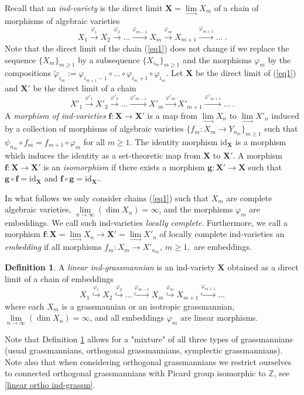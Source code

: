 \documentclass[12pt]{amsart}
\renewcommand{\phi}{\varphi}
\theoremstyle{definition}
\newtheorem{definition}[theorem]{Definition}
\begin{document}
Recall that an \textit{ind-variety} is the direct limit
$\mathbf{X}=\underset{\longrightarrow}\lim X_m$
of a chain of morphisms of algebraic varieties
\begin{equation}\label{eq1}
X_1\stackrel{\phi_1}{\to}X_2\stackrel{\phi_2}{\to}\dots\stackrel{\phi_{m-1}}{\to}X_m\stackrel{\phi_m}{\to}
X_{m+1}\stackrel{\phi_{m+1}}{\to}\dots\ .
\end{equation}
Note that the direct limit of the chain (\ref{eq1})
does not change if we replace the sequence
$\{X_m\}_{m\ge1}$ by a subsequence $\{X_{i_m}\}_{m\ge1}$ and the morphisms $\phi_m$ by the compositions
$\tilde{\phi}_{i_m}:={\phi}_{i_{m+1}-1}\circ...\circ{\phi}_{i_m+1}\circ{\phi}_{i_m}$.
Let $\mathbf{X}$ be the direct limit of (\ref{eq1}) and  $\mathbf{X}'$ be the direct limit of a chain
\begin{equation}\label{eq1'}
X'_1\stackrel{\phi'_1}{\to}X'_2\stackrel{\phi'_2}{\to}\dots\stackrel{\phi'_{m-1}}{\to}X'_m\stackrel{\phi'_m}{\to}
X'_{m+1}\stackrel{\phi'_{m+1}}{\to}\dots\ .
\end{equation}
A {\it morphism of ind-varieties} $\mathbf{f}:\mathbf{X}\to\mathbf{X}'$ is a map from
$\underset{\to}\lim X_n$ to $\underset{\to}\lim X'_n$ induced by a collection of morphisms of algebraic varieties
$\{f_m:X_m\to Y_{n_m}\}_{m\ge1}$
such that $\psi_{n_m}\circ f_m=f_{m+1}\circ\phi_m$ for all $m\ge1$.
The identity morphism $\mathrm{id}_\mathbf{X}$ is a morphism which induces the identity as a set-theoretic map from
$\mathbf{X}$ to $\mathbf{X}'$.
A morphism $\mathbf{f}:\mathbf{X}\to\mathbf{X}'$ is an \textit{isomorphism} if there exists a morphism
$\mathbf{g}:\mathbf{X}'\to\mathbf{X}$ such that $\mathbf{g}\circ\mathbf{f}=\mathrm{id}_\mathbf{X}$ and
$\mathbf{f}\circ\mathbf{g}=\mathrm{id}_{\mathbf{X}'}$.

In what follows we only consider chains (\ref{eq1}) such that $X_m$ are complete algebraic varieties,
$\underset{n\to\infty}\lim(\dim X_n)=\infty$, and the morphisms $\phi_m$ are embeddings. We call such ind-varieties
\textit{locally complete}. Furthermore, we call a morphism
$\mathbf{f}:\mathbf{X}=\underset{\to}\lim X_n\to\mathbf{X}'=\underset{\to}\lim X'_n$ of locally complete
ind-varieties an \textit{embedding} if all morphisms $f_m:X_m\to X'_{n_m},\ m\ge1,$ are embeddings.
\begin{definition}\label{lin ind-Gr}
A \textit{linear ind-grassmannian} is an ind-variety $\mathbf{X}$ obtained as a direct limit of a chain of embeddings
$$
X_1\overset{\phi_1}{\hookrightarrow}X_2\overset{\phi_2}{\hookrightarrow}\dots\overset{\phi_{m-1}}{\hookrightarrow}
X_m\overset{\phi_m}{\hookrightarrow}X_{m+1}\overset{\phi_{m+1}}{\hookrightarrow}\dots
$$
where each $X_m$ is a grassmannian or an isotropic grassmannian, $\underset{n\to\infty}\lim(\dim X_n)=\infty$,
and all embeddings $\phi_m$ are linear morphisms.
\end{definition}
Note that Definition \ref{lin ind-Gr} allows for a "mixture" of all three types of grassmannians (usual grassmannians,
orthogonal grassmannians, symplectic grassmannians). Note also that when considering orthogonal grassmannians we
restrict ourselves to connected orthogonal grassmannians with Picard group isomorphic to $\mathbb{Z}$, see
\ref{linear ortho ind-grassm}.
\end{document}

